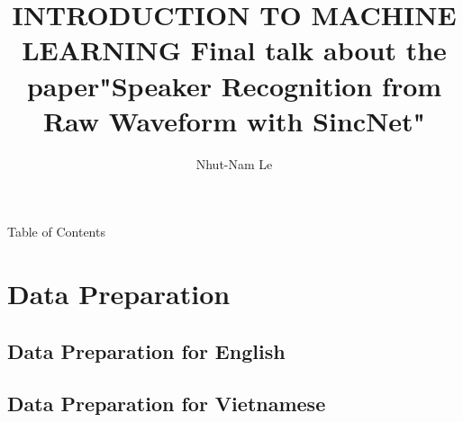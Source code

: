 \documentclass[11pt]{beamer}
\author{Nhut-Nam Le}
\title{INTRODUCTION TO MACHINE LEARNING \newline Final talk about the paper"Speaker Recognition from Raw Waveform with SincNet"}
\institute{Department of Computer Science, University of Science, VNU}
\begin{document}
\begin{frame}
	\titlepage
\end{frame}

\begin{frame}{Table of Contents}
	\tableofcontents
\end{frame}

\section{Data Preparation}
\subsection{Data Preparation for English}
\begin{frame}

\end{frame}
\subsection{Data Preparation for Vietnamese}
\begin{frame}
	
\end{frame}
\end{document}
